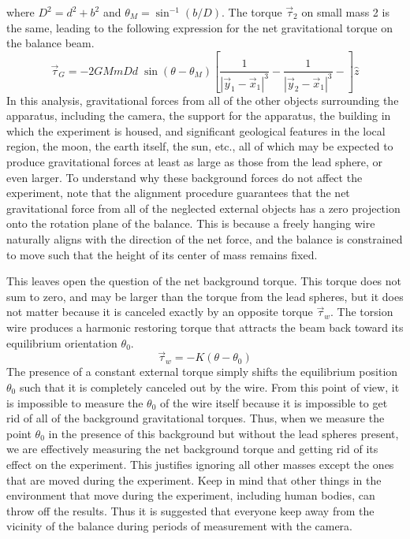 \documentclass{revtex4}
\begin{document}
where $D^2=d^2+b^2$ and $\theta_M=\sin^{-1}(b/D)$.
The torque $\vec{\tau}_2$ on small mass 2 is the same, leading to the
following expression for the net gravitational torque on the balance
beam.
\begin{equation}
\vec{\tau}_G = -2GMmDd\;\sin(\theta-\theta_M)\left[
\frac{1}{|\vec{y}_1-\vec{x}_1|^3}-
\frac{1}{|\vec{y}_2-\vec{x}_1|^3}-
\right]\hat{z}
\end{equation}
In this analysis, gravitational forces from all of the other objects
surrounding the apparatus, including the camera, the support for the
apparatus, the building in which the experiment is housed, and
significant geological features in the local region, the moon, the earth
itself, the sun, etc., all of which may be expected to produce gravitational
forces at least as large as those from the lead sphere, or even larger.
To understand why these background forces do not affect the experiment,
note that the alignment procedure guarantees that the net gravitational
force from all of the neglected external objects has a zero projection
onto the rotation plane of the balance.  This is because a freely hanging
wire naturally aligns with the direction of the net force, and the balance
is constrained to move such that the height of its center of mass remains
fixed.

This leaves open the question of the net background torque.  This torque
does not sum to zero, and may be larger than the torque from the lead
spheres, but it does not matter because it is canceled exactly by an
opposite torque $\vec{\tau}_w$.  The torsion wire produces a harmonic
restoring torque that attracts the beam back toward its equilibrium
orientation $\theta_0$.
\begin{equation}
\vec{\tau}_w = -K(\theta-\theta_0)
\label{eq:hooke}
\end{equation}
The presence of a constant external torque simply shifts the equilibrium
position $\theta_0$ such that it is completely canceled out by the wire.
From this point of view, it is impossible to measure the $\theta_0$ of the
wire itself because it is impossible to get rid of all of the background
gravitational torques.  Thus, when we measure the point $\theta_0$ in the
presence of this background but without the lead spheres present, we are
effectively measuring the net background torque and getting rid of its 
effect on the experiment.  This justifies ignoring all other masses except
the ones that are moved during the experiment.  Keep in mind that other
things in the environment that move during the experiment, including human
bodies, can throw off the results.  Thus it is suggested that everyone keep
away from the vicinity of the balance during periods of measurement with
the camera.
\end{document}
